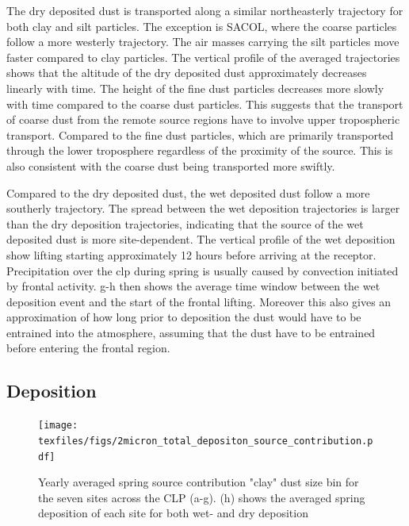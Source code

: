 The dry deposited dust is transported along a similar northeasterly trajectory for both clay and silt particles. 
The exception is SACOL, where the coarse particles follow a more westerly trajectory. 
The air masses carrying the silt particles move faster compared to clay particles.  
The vertical profile of the averaged trajectories shows that the altitude of the dry deposited dust approximately decreases linearly with time. 
The height of the fine dust particles decreases more slowly with time compared to the coarse dust particles. 
This suggests that the transport of coarse dust from the remote source regions have to involve upper tropospheric transport. 
Compared to the fine dust particles, which are primarily transported through the lower troposphere regardless of the proximity of the source. 
This is also consistent with the coarse dust being transported more swiftly.  

Compared to the dry deposited dust, the wet deposited dust follow a more southerly trajectory.
The spread between the wet deposition trajectories is larger than the dry deposition trajectories, indicating that the source of the wet deposited dust is more site-dependent.
The vertical profile of the wet deposition show lifting starting approximately 12 hours before arriving at the receptor. 
Precipitation over the \acrshort{clp} during spring is usually caused by convection initiated by frontal activity. g-h then shows the average time window between the wet deposition event and the start of the frontal lifting. Moreover this also gives an approximation of how long prior to deposition the dust would have to be entrained into the atmosphere, assuming that the dust have to be entrained before entering the frontal region.  
\subsection{Deposition}
\begin{figure}[htbp]
    \centering
    \texttt{[image: texfiles/figs/2micron\_total\_depositon\_source\_contribution.pdf]}
    \caption{Yearly averaged spring source contribution "clay" dust size bin for the seven sites across the CLP (a-g). (h) shows the averaged spring deposition of each site for both wet- and dry deposition}
    \label{fig:source_contrib_2mmu}
\end{figure}


